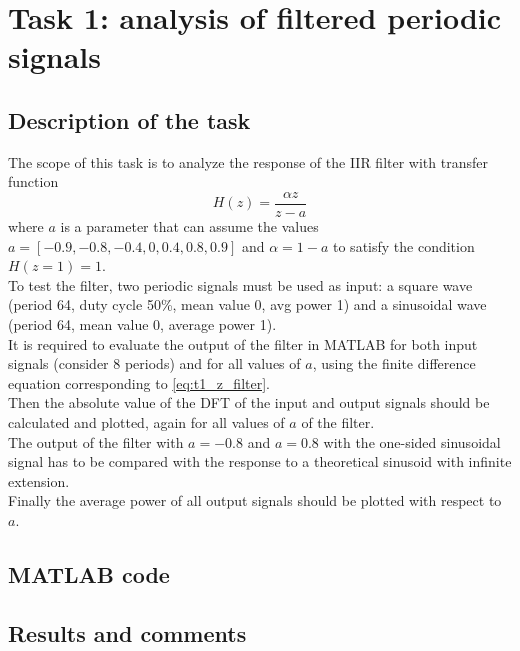 
\graphicspath{{graphics/task1/}}
\chapter{Task 1: analysis of filtered periodic signals}
\section{Description of the task}
The scope of this task is to analyze the response of the IIR filter with transfer function 
\begin{equation}
\label{eq:t1_z_filter}
H(z)=\frac{\alpha z}{z-a}
\end{equation}
where $a$ is a parameter that can assume the values $a= [-0.9, -0.8, -0.4, 0, 0.4, 0.8, 0.9]$ and $\alpha=1-a$ to satisfy the condition $H(z=1)=1$.\\
To test the filter, two periodic signals must be used as input: a square wave (period 64, duty cycle 50\%, mean value 0, avg power 1) and a sinusoidal wave (period 64, mean value 0, average power 1).\\
It is required to evaluate the output of the filter in MATLAB for both input signals (consider 8 periods) and for all values of $a$, using the finite difference equation corresponding to \cref{eq:t1_z_filter}.\\
Then the absolute value of the DFT of the input and output signals should be calculated and plotted, again for all values of $a$ of the filter.\\
The output of the filter with $a=-0.8$ and $a=0.8$ with the one-sided sinusoidal signal has to be compared with the response to a theoretical sinusoid with infinite extension.\\
Finally the average power of all output signals should be plotted with respect to $a$. 

\section{MATLAB code}


\pagebreak
\section{Results and comments}
